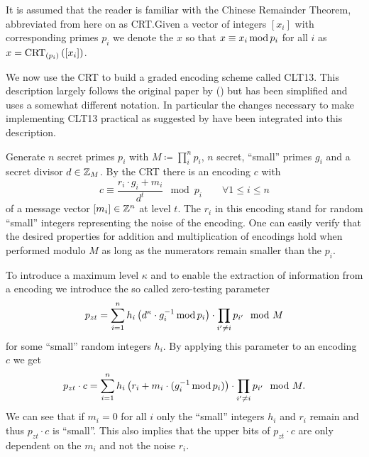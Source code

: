 \documentclass[english]{scrartcl}
\theoremstyle{plain}
\theoremstyle{definition}
\begin{document}
    It is assumed that the reader is familiar with the Chinese Remainder Theorem, abbreviated from here on as CRT.\@ Given a vector of integers $[x_i]$ with corresponding primes $p_i$ we denote the $x$ so that $x \equiv x_i \operatorname{mod} p_i$ for all $i$ as $x = \operatorname{CRT}_{(p_{i})}\left(\left[x_i\right]\right)$.

    We now use the CRT to build a graded encoding scheme called CLT13. This description largely follows the original paper by \citeauthor*{cryptoeprint:2013:183} (\cite{cryptoeprint:2013:183}) but has been simplified and uses a somewhat different notation.
    In particular the changes necessary to make implementing CLT13 practical as suggested by \citeauthor*{cryptoeprint:2013:183} have been integrated into this description.

    Generate $n$ secret primes $p_i$ with $M \coloneqq \prod_i^n p_i$, $n$ secret, \enquote{small} primes $g_i$ and a secret divisor $d \in \mathbb{Z}_{M}$.
    By the CRT there is an encoding $c$ with
    \begin{equation}
        c \equiv \frac{r_i \cdot g_i + m_i}{d^t} \mod p_i \qquad \forall 1 \leq i \leq n
    \end{equation}
    of a message vector $[m_i] \in \mathbb{Z}^n$ at level $t$. The $r_i$ in this encoding stand for random \enquote{small} integers representing the noise of the encoding.
    One can easily verify that the desired properties for addition and multiplication of encodings hold when performed modulo $M$ as long as the numerators remain smaller than the $p_i$.

    To introduce a maximum level $\kappa$ and to enable the extraction of information from a encoding we introduce the so called zero-testing parameter
    \begin{equation}\label{eq:pzt}
        p_{zt} = \sum_{i=1}^n h_i \left(d^\kappa \cdot g_i^{-1} \operatorname{mod} p_i\right) \cdot \prod_{i' \neq i} p_{i'} \mod M
    \end{equation}
    for some \enquote{small} random integers $h_i$.
    By applying this parameter to an encoding $c$ we get
    \begin{equation*}
        p_{zt} \cdot c = \sum_{i=1}^n h_i \left(r_i + m_i \cdot (g_i^{-1} \operatorname{mod} p_i)\right) \cdot \prod_{i' \neq i} p_{i'} \mod M.
    \end{equation*}
    We can see that if $m_i = 0$ for all $i$ only the \enquote{small} integers $h_i$ and $r_i$ remain and thus $p_{zt} \cdot c$ is \enquote{small}.
    This also implies that the upper bits of $p_{zt} \cdot c$ are only dependent on the $m_i$ and not the noise $r_i$.
\end{document}
